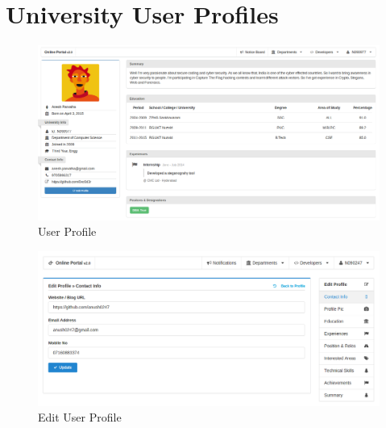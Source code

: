 \documentclass[12pt]{report}
\begin{document}
\section{University User Profiles}
\begin{figure}[H]
\begin{center}
\includegraphics[scale=0.4]{RID_Pics/Profile}
\caption{User Profile\label{fig:User Profile Section}}
\end{center}
\end{figure}
\begin{figure}[H]
\begin{center}
\includegraphics[scale=0.4]{RID_Pics/Edit_Profile}
\caption{Edit User Profile\label{fig:Edit User Profile}}
\end{center}
\end{figure}
\end{document}
